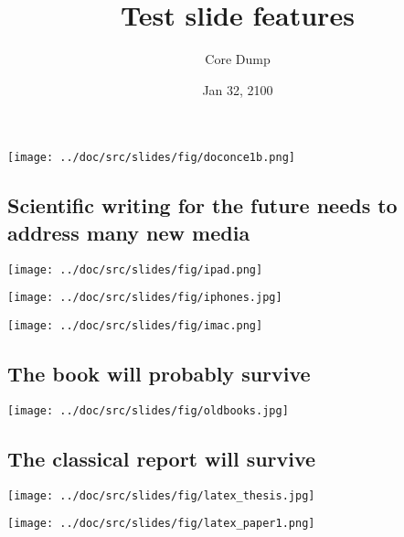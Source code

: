 \documentclass[%
oneside,                 %
final,                   %
10pt]{article}
\newcounter{doconce:movie:counter}
\begin{document}
\newcommand{\exercisesection}[1]{\subsection*{#1}}


\title{Test slide features}
\author{Core Dump}
\date{Jan 32, 2100
}
\vspace{6mm}
\centerline{\texttt{[image: ../doc/src/slides/fig/doconce1b.png]}}
\vspace{6mm}
\subsection{Scientific writing for the future needs to address many new media}
\vspace{6mm}
\centerline{\texttt{[image: ../doc/src/slides/fig/ipad.png]}}
\vspace{6mm}
\vspace{6mm}
\centerline{\texttt{[image: ../doc/src/slides/fig/iphones.jpg]}}
\vspace{6mm}
\vspace{6mm}
\centerline{\texttt{[image: ../doc/src/slides/fig/imac.png]}}
\vspace{6mm}
\subsection{The book will probably survive}
\vspace{6mm}
\centerline{\texttt{[image: ../doc/src/slides/fig/oldbooks.jpg]}}
\vspace{6mm}
\subsection{The classical report will survive}
\vspace{6mm}
\centerline{\texttt{[image: ../doc/src/slides/fig/latex\_thesis.jpg]}}
\vspace{6mm}
\vspace{6mm}
\centerline{\texttt{[image: ../doc/src/slides/fig/latex\_paper1.png]}}
\vspace{6mm}
\end{document}
